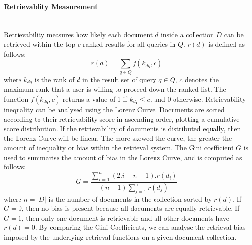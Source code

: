 \paragraph{Retrievablity Measurement}
\ \\
Retrievability measures how likely each document $ d $ inside a collection $ D $ can be retrieved within the top \textit{c} ranked results for all queries in $ Q $. $ r(d) $ is defined as follows:
\[
r(d)=\sum_{q \in Q}f(k_{dq},c)
\]
where $ k_{dq} $ is the rank of $ d $ in the result set of query $ q \in Q $, $ c $ denotes the maximum rank that a user is willing to proceed down the ranked list. The function $ f(k_{dq},c) $ returns a value of 1 if $ k_{dq} \leq c $, and 0 otherwise. Retrievability inequality can be analysed using the Lorenz Curve. Documents are sorted according to their retrievability score in ascending order, plotting a cumulative score distribution. If the retrievability of documents is distributed equally, then the Lorenz Curve will be linear. The more skewed the curve, the greater the amount of inequality or bias within the retrieval system. The Gini coefficient $ G $ is used to summarise the amount of bias in the Lorenz Curve, and is computed as follows:
\begin{equation}
G=\frac{\sum_{i=1}^n(2.i-n-1).r(d_{i})}{(n-1)\sum_{j=1}^nr(d_{j})}
\end{equation}
\noindent
where $ n=|D| $ is the number of documents in the collection sorted by $ r(d) $. If $ G=0 $, then no bias is present because all documents are equally retrievable. If $ G=1 $, then only one document is retrievable and all other documents have $ r(d)=0 $. By comparing the Gini-Coefficients, we can analyse the retrieval bias imposed by the underlying retrieval functions on a given document collection.
